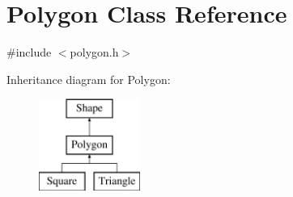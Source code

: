\hypertarget{class_polygon}{}\section{Polygon Class Reference}
\label{class_polygon}


{\ttfamily \#include $<$polygon.\+h$>$}

Inheritance diagram for Polygon\+:\begin{figure}[H]
\begin{center}
\leavevmode
\includegraphics[height=3.000000cm]{class_polygon}
\end{center}
\end{figure}
